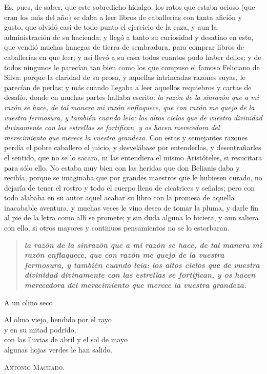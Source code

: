 \documentclass[a4paper,12pt]{article} %
\begin{document}
Es, pues, de saber, que este sobredicho hidalgo, los ratos que estaba ocioso (que eran los más del año) se daba a leer libros de caballerías con tanta afición y gusto, que olvidó casi de todo punto el ejercicio de la caza, y aun la administración de su hacienda; y llegó a tanto su curiosidad y desatino en esto, que vendió muchas hanegas de tierra de sembradura, para comprar libros de caballerías en que leer; y así llevó a su casa todos cuantos pudo haber dellos; y de todos ningunos le parecían tan bien como los que compuso el famoso Feliciano de Silva: porque la claridad de su prosa, y aquellas intrincadas razones suyas, le parecían de perlas; y más cuando llegaba a leer aquellos requiebros y cartas de desafío, donde en muchas partes hallaba escrito: 
\textit{la razón de la sinrazón que a mi razón se hace, de tal manera mi razón enflaquece, que con razón me quejo de la vuestra fermosura, y también cuando leía: los altos cielos que de vuestra divinidad divinamente con las estrellas se fortifican, y os hacen merecedora del merecimiento que merece la vuestra grandeza.}
Con estas y semejantes razones perdía el pobre caballero el juicio, y desvelábase por entenderlas, y desentrañarles el sentido, que no se lo sacara, ni las entendiera el mismo Aristóteles, si resucitara para sólo ello. No estaba muy bien con las heridas que don Belianis daba y recibía, porque se imaginaba que por grandes maestros que le hubiesen curado, no dejaría de tener el rostro y todo el cuerpo lleno de cicatrices y señales; pero con todo alababa en su autor aquel acabar su libro con la promesa de aquella inacabable aventura, y muchas veces le vino deseo de tomar la pluma, y darle fin al pie de la letra como allí se promete; y sin duda alguna lo hiciera, y aun saliera con ello, si otros mayores y continuos pensamientos no se lo estorbaran.


\begin{quote}
\itshape
\bfseries
    la razón de la sinrazón que a mi razón se hace, de tal manera mi razón enflaquece, que con razón me quejo de la vuestra fermosura, y también cuando leía: los altos cielos que de vuestra divinidad divinamente con las estrellas se fortifican, y os hacen merecedora del merecimiento que merece la vuestra grandeza.
\end{quote}

\begin{flushleft}

A un olmo seco

Al olmo viejo, hendido por el rayo \\
y en su mitad podrido, \\
con las lluvias de abril y el sol de mayo \\
algunas hojas verdes le han salido. \\

\bigskip

\textsc{Antonio Machado.}

\end{flushleft}
\end{document}
